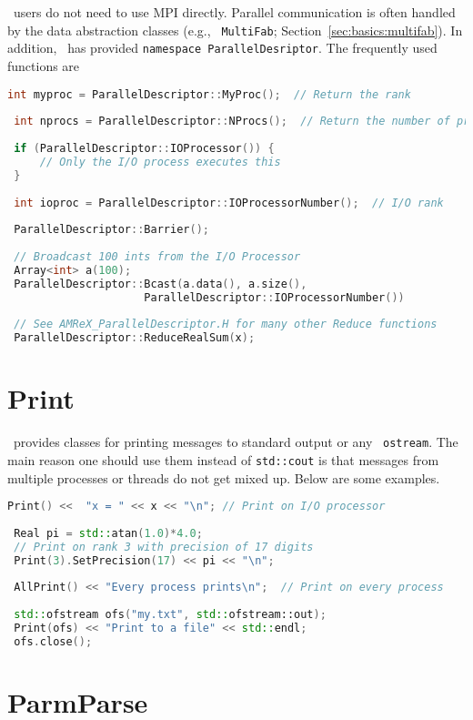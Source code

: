 \amrex\ users do not need to use MPI directly.  Parallel communication
is often handled by the data abstraction classes (e.g., {\tt
  MultiFab}; Section~\ref{sec:basics:multifab}).  In addition, \amrex\
has provided {\tt namespace ParallelDesriptor}.  The frequently used
functions are 
\begin{lstlisting}[language=cpp]
 int myproc = ParallelDescriptor::MyProc();  // Return the rank
 
 int nprocs = ParallelDescriptor::NProcs();  // Return the number of processes
 
 if (ParallelDescriptor::IOProcessor()) { 
     // Only the I/O process executes this
 }
 
 int ioproc = ParallelDescriptor::IOProcessorNumber();  // I/O rank
 
 ParallelDescriptor::Barrier();
 
 // Broadcast 100 ints from the I/O Processor
 Array<int> a(100);
 ParallelDescriptor::Bcast(a.data(), a.size(),
                     ParallelDescriptor::IOProcessorNumber())
 
 // See AMReX_ParallelDescriptor.H for many other Reduce functions 
 ParallelDescriptor::ReduceRealSum(x);
\end{lstlisting}

\section{Print}
\label{sec:basics:print}

\amrex\ provides classes for printing messages to standard output or
any \cpp\ {\tt ostream}.  The main reason one should use them instead
of {\tt std::cout} is that messages from multiple processes or
threads do not get mixed up.  Below are some examples.
\begin{lstlisting}[language=cpp]
 Print() <<  "x = " << x << "\n"; // Print on I/O processor
 
 Real pi = std::atan(1.0)*4.0;
 // Print on rank 3 with precision of 17 digits
 Print(3).SetPrecision(17) << pi << "\n";
 
 AllPrint() << "Every process prints\n";  // Print on every process
 
 std::ofstream ofs("my.txt", std::ofstream::out);
 Print(ofs) << "Print to a file" << std::endl;
 ofs.close();
\end{lstlisting}

\section{ParmParse}

